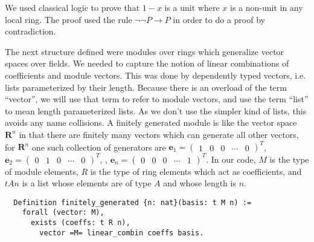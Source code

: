 \documentclass{article}
\begin{document}
We used classical logic to prove that \(1 - x\) is a unit where \(x\) is a
non-unit in any local ring. The proof used the rule \(\neg\neg P\rightarrow
P\) in order to do a proof by contradiction.

The next structure defined were modules over rings which generalize vector
spaces over fields. We needed to capture the notion of linear combinations of
coefficients and module vectors. This was done by dependently typed vectors,
i.e. lists parameterized by their length. Because there is an overload of the
term ``vector'', we will use that term to refer to module vectors, and use the
term ``list'' to mean length parameterized lists. As we don't use the simpler
kind of lists, this avoids any name collisions. A finitely generated module is
like the vector space \(\mathbf{R}^{n}\) in that there are finitely many
vectors which can generate all other vectors, for \(\mathbf{R}^{n}\) one such
collection of generators are \(\mathbf{e}_{1} = \begin{pmatrix} 1 & 0 & 0 &
  \cdots & 0\end{pmatrix}^{T}\), \(\mathbf{e}_{2} = \begin{pmatrix} 0 & 1 & 0 &
  \cdots & 0\end{pmatrix}^{T}\), \textellipsis, \(\mathbf{e}_{n} =
  \begin{pmatrix} 0 & 0 & 0 & \cdots & 1\end{pmatrix}^{T}\). In our code, \(M\)
is the type of module elements, \(R\) is the type of ring elements which act
as coefficients, and \(t A n\) is a list whose elements are of type \(A\) and
whose length is \(n\).
\begin{verbatim}
  Definition finitely_generated {n: nat}(basis: t M n) :=
    forall (vector: M),
      exists (coeffs: t R n),
        vector =M= linear_combin coeffs basis.
\end{verbatim}
\end{document}
